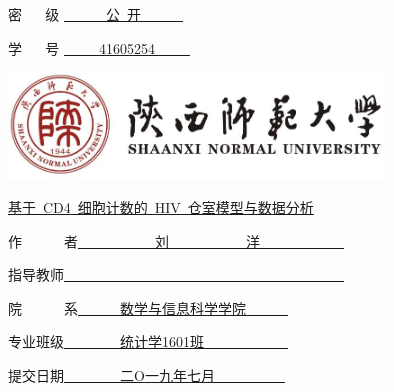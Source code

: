 \documentclass[12pt,twoside,UTF8]{ctexart}
\theoremstyle{nonumberplain}
\begin{document}
\thispagestyle{empty}

\renewcommand\arraystretch{1.3}


密\ \ \ \,级 \underline{\ \ \ \ \ \ 公\ 开\ \ \ \ \ \ }


学\ \ \ \,号 \underline{\ \ \ \ \  41605254\ \ \ \ \  }

\vspace*{2cm}

\begin{center}
\includegraphics[width=10cm]{snnu.jpg}
\end{center}


\vspace*{1cm}
\begin{center}
{\songti\heiti{}  \underline{{基于~{\huge CD4}~细胞计数的~{\huge HIV}~仓室模型与数据分析}}}
\end{center}
\vspace*{5cm}

\begin{center}{\heiti{}作\ \ \  \ \ \ 者\underline{{\ \ \ \ \ \ \ \ \ \ \ 刘\ \ \ \ \ \ \ \ \ \ \ 洋\ \ \ \ \ \ \ \ \ \ \ \ }}}\end{center}

\begin{center}{\heiti{}指导教师\underline{\ \ \ \ \ \ \ \ \ \ \ \ \ \ \ \ \ \ \ \ \ \ \ \ \ \ \ \ \ \ \ \ \ \ \ \ \ \ \ \ }}\end{center}


\begin{center}{\heiti{}院\ \ \ \ \ \ 系\underline{\ \ \ \ \ \ 数学与信息科学学院\ \ \ \ \ \
 }}\end{center}

\begin{center}{\heiti{}专业班级\underline{\ \ \ \ \ \ \ \  统计学1601班\ \ \ \ \ \ \ \ \ \ \ \
 }}\end{center}

\begin{center}{\heiti{}提交日期\underline{\ \ \ \ \ \ \ \ 二{O}一九年七月\ \ \ \ \ \ \ \ \ \ }}\end{center}
\end{document}
